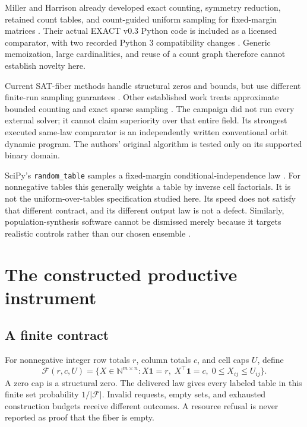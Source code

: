 \documentclass[11pt,letterpaper]{article}
\newcommand{\F}{\mathcal F}
\newcommand{\N}{\mathbb N}
\begin{document}
Miller and Harrison already developed exact counting, symmetry reduction, retained
count tables, and count-guided uniform sampling for fixed-margin matrices \cite{miller}.
Their actual EXACT v0.3 Python code is included as a licensed comparator, with two
recorded Python 3 compatibility changes \cite{exact}. Generic memoization, large
cardinalities, and reuse of a count graph therefore cannot establish novelty here.

Current SAT-fiber methods handle structural zeros and bounds, but use different finite-run
sampling guarantees \cite{satfiber}. Other established work treats approximate bounded
counting and exact sparse sampling \cite{cryan,sparse}. The campaign did not run every
external solver; it cannot claim superiority over that entire field. Its strongest executed
same-law comparator is an independently written conventional orbit dynamic program.
The authors' original algorithm is tested only on its supported binary domain.

SciPy's \texttt{random\_table} samples a fixed-margin conditional-independence law
\cite{scipy}. For nonnegative tables this generally weights a table by inverse cell
factorials. It is not the uniform-over-tables specification studied here. Its speed
does not satisfy that different contract, and its different output law is not a defect.
Similarly, population-synthesis software cannot be dismissed merely because it targets
realistic controls rather than our chosen ensemble \cite{population}.

\section{The constructed productive instrument}

\subsection{A finite contract}

For nonnegative integer row totals $r$, column totals $c$, and cell caps $U$, define
\begin{equation}
\F(r,c,U)=\{X\in\N^{m\times n}: X\mathbf1=r,\;X^\top\mathbf1=c,\;0\le X_{ij}\le U_{ij}\}.
\label{eq:fiber}
\end{equation}
A zero cap is a structural zero. The delivered law gives every labeled table in this
finite set probability $1/|\F|$. Invalid requests, empty sets, and exhausted construction
budgets receive different outcomes. A resource refusal is never reported as proof that
the fiber is empty.
\end{document}

